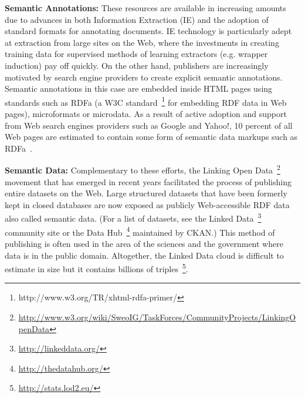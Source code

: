 \textbf{Semantic Annotations:} These resources are available in increasing amounts due to advances in both Information Extraction (IE) and the adoption of standard formats for annotating documents. 
IE technology is particularly adept at extraction from large sites on the Web, where the investments in creating training data for supervised methods of learning extractors (e.g. wrapper induction) pay off quickly. On the other hand, publishers are increasingly motivated by search engine providers to create explicit semantic annotations. 
Semantic annotations in this case are embedded inside HTML pages using standards such as RDFa (a W3C standard~\footnote{http://www.w3.org/TR/xhtml-rdfa-primer/} for embedding RDF data in Web pages), microformats or microdata. 
As a result of active adoption and support from Web search engines providers such as Google and Yahoo!, 10 percent of all Web pages are estimated to contain some form of semantic data markups such as RDFa~\cite{DBLP:conf/semweb/MikaMZ09}. 

\textbf{Semantic Data:} Complementary to these efforts, the Linking Open Data~\footnote{\url{http://www.w3.org/wiki/SweoIG/TaskForces/CommunityProjects/LinkingOpenData}} movement that has emerged in recent years facilitated the process of publishing entire datasets on the Web. Large structured datasets that have been formerly kept in closed databases are now exposed as publicly Web-accessible RDF data also called semantic data. (For a list of datasets, see the Linked Data~\footnote{\url{http://linkeddata.org/}} community site or the Data Hub~\footnote{\url{http://thedatahub.org/}} maintained by CKAN.) This method of publishing is often used in the area of the sciences and the government where data is in the public domain. 
Altogether, the Linked Data cloud is difficult to estimate in size but it contains billions of triples~\footnote{\url{http://stats.lod2.eu/}}.

